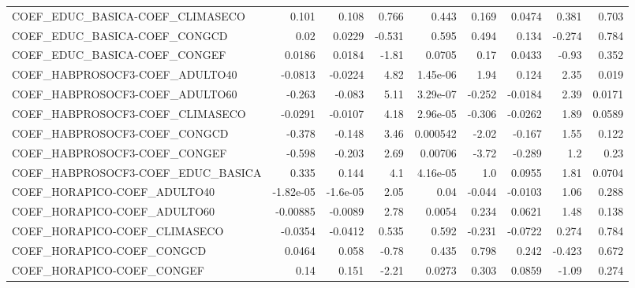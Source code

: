 \begin{tabular}{lrrrrrrrr}
COEF\_EDUC\_BASICA-COEF\_CLIMASECO   &       0.101 &        0.108 &   0.766 &    0.443 &      0.169 &      0.0474 &        0.381 &         0.703 \\
COEF\_EDUC\_BASICA-COEF\_CONGCD      &        0.02 &       0.0229 &  -0.531 &    0.595 &      0.494 &       0.134 &       -0.274 &         0.784 \\
COEF\_EDUC\_BASICA-COEF\_CONGEF      &      0.0186 &       0.0184 &   -1.81 &   0.0705 &       0.17 &      0.0433 &        -0.93 &         0.352 \\
COEF\_HABPROSOCF3-COEF\_ADULTO40    &     -0.0813 &      -0.0224 &    4.82 & 1.45e-06 &       1.94 &       0.124 &         2.35 &         0.019 \\
COEF\_HABPROSOCF3-COEF\_ADULTO60    &      -0.263 &       -0.083 &    5.11 & 3.29e-07 &     -0.252 &     -0.0184 &         2.39 &        0.0171 \\
COEF\_HABPROSOCF3-COEF\_CLIMASECO   &     -0.0291 &      -0.0107 &    4.18 & 2.96e-05 &     -0.306 &     -0.0262 &         1.89 &        0.0589 \\
COEF\_HABPROSOCF3-COEF\_CONGCD      &      -0.378 &       -0.148 &    3.46 & 0.000542 &      -2.02 &      -0.167 &         1.55 &         0.122 \\
COEF\_HABPROSOCF3-COEF\_CONGEF      &      -0.598 &       -0.203 &    2.69 &  0.00706 &      -3.72 &      -0.289 &          1.2 &          0.23 \\
COEF\_HABPROSOCF3-COEF\_EDUC\_BASICA &       0.335 &        0.144 &     4.1 & 4.16e-05 &        1.0 &      0.0955 &         1.81 &        0.0704 \\
COEF\_HORAPICO-COEF\_ADULTO40       &   -1.82e-05 &     -1.6e-05 &    2.05 &     0.04 &     -0.044 &     -0.0103 &         1.06 &         0.288 \\
COEF\_HORAPICO-COEF\_ADULTO60       &    -0.00885 &      -0.0089 &    2.78 &   0.0054 &      0.234 &      0.0621 &         1.48 &         0.138 \\
COEF\_HORAPICO-COEF\_CLIMASECO      &     -0.0354 &      -0.0412 &   0.535 &    0.592 &     -0.231 &     -0.0722 &        0.274 &         0.784 \\
COEF\_HORAPICO-COEF\_CONGCD         &      0.0464 &        0.058 &   -0.78 &    0.435 &      0.798 &       0.242 &       -0.423 &         0.672 \\
COEF\_HORAPICO-COEF\_CONGEF         &        0.14 &        0.151 &   -2.21 &   0.0273 &      0.303 &      0.0859 &        -1.09 &         0.274 \\

\end{tabular}
